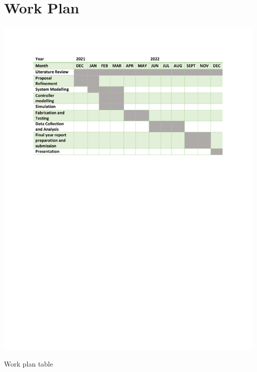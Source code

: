 \section{Work Plan}
\begin{table}[!h]
\includegraphics{Figures/workplan}
\caption{Work plan table}
\end{table}
